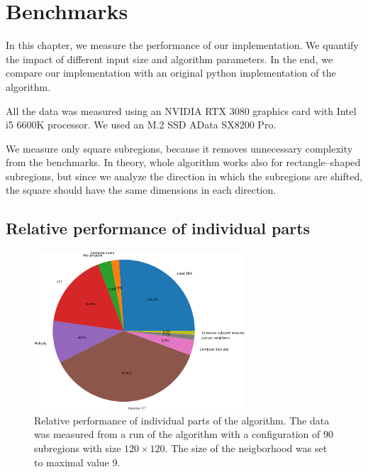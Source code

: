 \chapter{Benchmarks}

In this chapter, we measure the performance of our implementation. We quantify the impact of different input size and algorithm parameters. In the end, we compare our implementation with an original python implementation of the algorithm.

All the data was measured using an NVIDIA RTX 3080 graphics card with Intel i5 6600K processor. We used an M.2 SSD AData SX8200 Pro.


We measure only square subregions, because it removes unnecessary complexity from the benchmarks. In theory, whole algorithm works also for rectangle--shaped subregions, but since we analyze the direction in which the subregions are shifted, the square should have the same dimensions in each direction.

\section{Relative performance of individual parts}

\begin{figure}
	\centering
	\includegraphics[width=0.7\textwidth]{img/eval/individual-parts}
	\caption{Relative performance of individual parts of the algorithm. The data was measured from a run of the algorithm with a configuration of 90 subregions with size $120 \times 120$. The size of the neigborhood was set to maximal value 9. }
	\label{individual-parts}
\end{figure}

